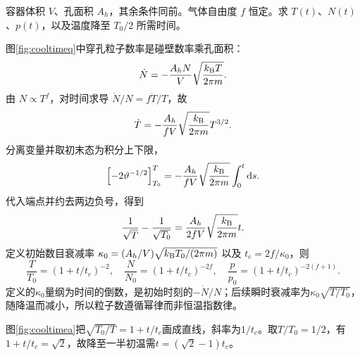 \begin{example}[温度和粒子数的时间规律]\label{ex:coolingtime}
容器体积 $V$、孔面积 $A_h$，其余条件同前。气体自由度 $f$ 恒定。求 $T(t)$、$N(t)$、$p(t)$，以及温度降至 $T_0/2$ 所需时间。
\end{example}
\begin{solution}
图\ref{fig:cooltimeq}中穿孔粒子数率是碰壁数率乘孔面积：
\[
 \dot N=-\frac{A_hN}{V}\sqrt{\frac{k_{\mathrm B} T}{2\pi m}}.
\]
由 $N\propto T^f$，对时间求导 $\dot N/N=f\dot T/T$，故
\[
 \dot T=-\frac{A_h}{fV}\sqrt{\frac{k_{\mathrm B}}{2\pi m}}T^{3/2}.
\]
分离变量并取初末态为积分上下限，
\[
 \left[-2\vartheta^{-1/2}\right]_{T_0}^{T}
 =-\frac{A_h}{fV}\sqrt{\frac{k_{\mathrm B}}{2\pi m}}\int_0^t\mathop{}\!\mathrm d s.
\]
代入端点并约去两边负号，得到
\[
 \frac1{\sqrt T}-\frac1{\sqrt{T_0}}
 =\frac{A_h}{2fV}\sqrt{\frac{k_{\mathrm B}}{2\pi m}}t.
\]
定义初始数目衰减率 $\kappa_0=(A_h/V)\sqrt{k_{\mathrm B} T_0/(2\pi m)}$ 以及 $t_c=2f/\kappa_0$，则
\[
 \frac{T}{T_0}=(1+t/t_c)^{-2},\quad
 \frac{N}{N_0}=(1+t/t_c)^{-2f},\quad
 \frac{p}{p_0}=(1+t/t_c)^{-2(f+1)}.
\]
定义的$\kappa_0$量纲为时间的倒数，是初始时刻的$-\dot N/N$；后续瞬时衰减率为$\kappa_0\sqrt{T/T_0}$，随降温而减小，所以粒子数遵循幂律而非恒温指数律。

图\ref{fig:cooltimea}把$\sqrt{T_0/T}=1+t/t_c$画成直线，斜率为$1/t_c$。取$T/T_0=1/2$，有$1+t/t_c=\sqrt2$，故降至一半初温需$t=(\sqrt2-1)t_c$。
\end{solution}

